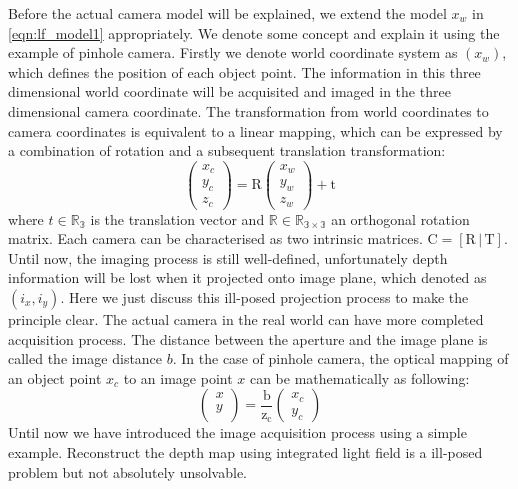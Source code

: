 Before the actual camera model will be explained, we extend the model $x_w$ in \ref{eqn:lf_model1} appropriately. We denote some concept and explain it using the example of pinhole camera. Firstly we denote world coordinate system as $(x_w)$, which defines the position of each object point. The information in this three dimensional world coordinate will be acquisited and imaged in the three dimensional camera coordinate. The transformation from world coordinates to camera coordinates is equivalent to a linear mapping, which can be expressed by a combination of rotation and a subsequent translation transformation:
\begin{equation}
\label{eqn:world-camera transformation}
\begin{pmatrix}
x_c \\
y_c\\
z_c
\end{pmatrix} = \mathrm{R}
\begin{pmatrix}
x_w \\
y_w\\
z_w
\end{pmatrix} + \mathrm{t}
\end{equation}
where $t \in \mathbb{R_{3}}$ is the translation vector and $\mathbb{R} ∈ \mathbb{R_{3\times3}}$ an orthogonal rotation matrix. Each camera can be characterised as two intrinsic matrices. $\mathrm{C} = [\mathrm{R}\,|\,\mathrm{T}]$.
Until now, the imaging process is still well-defined, unfortunately depth information will be lost when it projected onto image plane, which denoted as $(i_x, i_y)$. Here we just discuss this ill-posed projection process to make the principle clear. The actual camera in the real world can have more completed acquisition process. The distance between the aperture and the image plane is called the image distance $b$. In the case of pinhole camera, the optical mapping of an object point $x_c$ to an image point $x$ can be mathematically as following:
\begin{equation}
\label{eqn:camera-image transformation}
\begin{pmatrix}
x\\
y\\
\end{pmatrix} = \mathrm{\frac{b}{z_c}}
\begin{pmatrix}
x_c \\
y_c
\end{pmatrix}
\end{equation}
Until now we have introduced the image acquisition process using a simple example. Reconstruct the depth map using integrated light field is a ill-posed problem but not absolutely unsolvable. 






